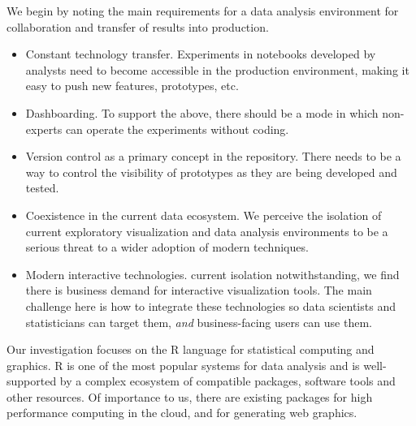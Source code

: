 
We begin by noting the main requirements for a data analysis environment for
collaboration and transfer of results into production.

\begin{itemize}
\item Constant technology transfer. Experiments in notebooks developed
by analysts need to become accessible in the production environment,
making it easy to push new features, prototypes, etc.
\item Dashboarding. To support the above, there should be a mode in which non-experts
can operate the experiments without coding.
\item Version control as a primary concept in the repository. There
needs to be a way to control the visibility of prototypes as they are
being developed and tested.
\item Coexistence in the current data ecosystem. We perceive the
isolation of current exploratory visualization and data analysis
environments to be a serious threat to a wider adoption of modern
techniques.
\item Modern interactive technologies. current isolation
notwithstanding, we find there is business demand for interactive
visualization tools. The main challenge here is how to integrate
these technologies so data scientists and statisticians can target
them, \emph{and} business-facing users can use them.
\end{itemize}

Our investigation focuses on the R language \cite{RCoreTeam:2013:R}
for statistical computing and graphics. R is one of the most popular
systems for data analysis and is well-supported by
a complex ecosystem of compatible packages, software
tools and other resources.
%
Of importance to us, there are existing
packages for high performance computing in the cloud,
and for generating web graphics. %

